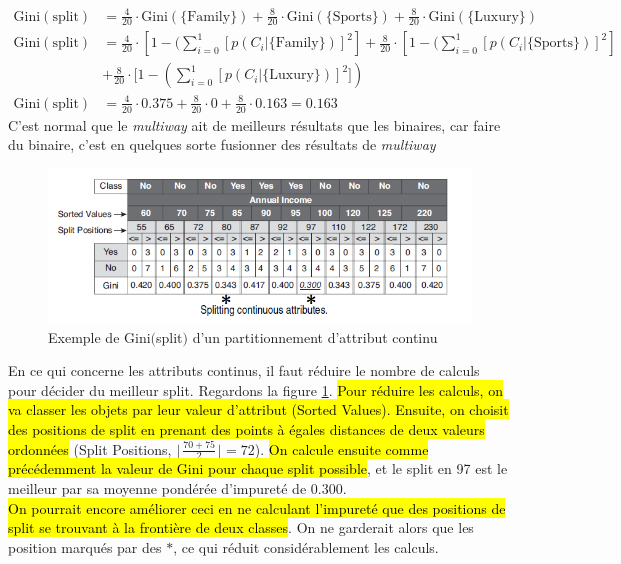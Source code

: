 \documentclass[letterpaper, 12pt]{article}
\newcommand{\alinea}{
\hspace*{0.5cm}}
\begin{document}
			\begin{align*}
				\text{Gini}(\text{split}) &= \frac{4}{20} \cdot 
					\text{Gini}(\{\text{Family}\}) + \frac{8}{20} \cdot 
					\text{Gini}(\{\text{Sports}\}) + \frac{8}{20} \cdot 
					\text{Gini}(\{\text{Luxury}\})\\
				\text{Gini}(\text{split}) &= 
				\frac{4}{20} \cdot 
				[1 - (\sum_{i=0}^{1}[p(C_i|\{\text{Family}\})]^2] + 
				\frac{8}{20} \cdot 
				[1 - (\sum_{i=0}^{1}[p(C_i|\{\text{Sports}\})]^2]\\ 
				&+ 
				\frac{8}{20} \cdot 
				[1 - (\sum_{i=0}^{1}[p(C_i|\{\text{Luxury}\})]^2])\\
				\text{Gini}(\text{split}) &= \frac{4}{20} \cdot 0.375
					 + \frac{8}{20} \cdot 0
					 + \frac{8}{20} \cdot 0.163 = 0.163
			\end{align*}
			C'est normal que le \textit{multiway} ait de meilleurs résultats
				que les binaires, car faire du binaire, c'est en quelques
				sorte fusionner	des résultats de \textit{multiway}\\	
			\begin{figure}[H]
				\centering
				\includegraphics[scale=1.0]{Images/tree_split_measure2.png}
				\caption{Exemple de Gini$($split$)$ d'un partitionnement
						 d'attribut continu}
				\label{fig:tree:split_measure2}
			\end{figure}\noindent
			\alinea En ce qui concerne les attributs continus, 
				il faut réduire 
				le nombre de calculs pour décider du meilleur split. 
				Regardons la figure \ref{fig:tree:split_measure2}.
				\hl{Pour réduire les calculs, on va classer les objets 
				par leur valeur d'attribut
				(Sorted Values). Ensuite, on choisit des positions de split
				en prenant des points à égales distances de deux 
				valeurs ordonnées} (Split Positions, 
				$\lfloor\frac{70 + 75}{2}\rfloor = 72$). \hl{On calcule 
				ensuite
				comme précédemment la valeur de Gini pour chaque split
				 possible},
				et le split en 97 est le meilleur par sa moyenne pondérée 
				d'impureté de 0.300.\\
			\alinea \hl{On pourrait encore améliorer ceci en ne calculant 
				l'impureté que des positions de split se trouvant à la
				frontière de deux classes}. On ne garderait alors que 
				les position marqués par des $\ast$, ce qui réduit 
				considérablement les calculs.
\end{document}

